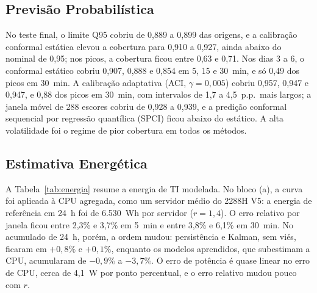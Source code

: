 \documentclass[a4paper,12pt]{article}
\begin{document}
\subsection{Previsão Probabilística}
\label{sec:probabilistica}

No teste final, o limite Q95 cobriu de 0,889 a 0,899 das origens, e a calibração conformal estática elevou a cobertura para 0,910 a 0,927, ainda abaixo do nominal de 0,95; nos picos, a cobertura ficou entre 0,63 e 0,71. Nos dias 3 a 6, o conformal estático cobriu 0,907, 0,888 e 0,854 em 5, 15 e 30~min, e só 0,49 dos picos em 30~min. A calibração adaptativa (ACI, $\gamma = 0{,}005$) cobriu 0,957, 0,947 e 0,947, e 0,88 dos picos em 30~min, com intervalos de 1,7 a 4,5~p.p.\ mais largos; a janela móvel de 288 escores cobriu de 0,928 a 0,939, e a predição conformal sequencial por regressão quantílica (SPCI) ficou abaixo do estático. A alta volatilidade foi o regime de pior cobertura em todos os métodos.

\subsection{Estimativa Energética}
\label{sec:energia}

A Tabela~\ref{tab:energia} resume a energia de TI modelada. No bloco (a), a curva foi aplicada à CPU agregada, como um servidor médio do 2288H V5: a energia de referência em 24~h foi de 6.530~Wh por servidor ($r = 1{,}4$). O erro relativo por janela ficou entre 2,3\% e 3,7\% em 5~min e entre 3,8\% e 6,1\% em 30~min. No acumulado de 24~h, porém, a ordem mudou: persistência e Kalman, sem viés, ficaram em $+0{,}8\%$ e $+0{,}1\%$, enquanto os modelos aprendidos, que subestimam a CPU, acumularam de $-0{,}9\%$ a $-3{,}7\%$. O erro de potência é quase linear no erro de CPU, cerca de 4,1~W por ponto percentual, e o erro relativo mudou pouco com $r$.
\end{document}
